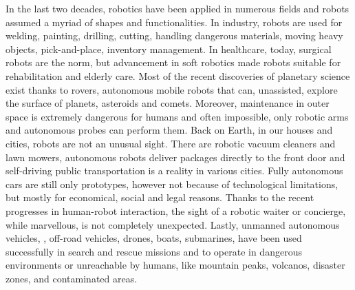 In the last two decades, robotics have been applied in numerous fields and robots assumed a myriad of shapes and functionalities. In industry, robots are used for welding, painting, drilling, cutting, handling dangerous materials, moving heavy objects, pick-and-place, inventory management. In healthcare, today, surgical robots are the norm, but advancement in soft robotics made robots suitable for rehabilitation and elderly care. Most of the recent discoveries of planetary science exist thanks to rovers, autonomous mobile robots that can, unassisted, explore the surface of planets, asteroids and comets. Moreover, maintenance in outer space is extremely dangerous for humans and often impossible, only robotic arms and autonomous probes can perform them. Back on Earth, in our houses and cities, robots are not an unusual sight. There are robotic vacuum cleaners and lawn mowers,  autonomous robots deliver packages directly to the front door and self-driving public transportation is a reality in various cities. Fully autonomous cars are still only prototypes, however not because of technological limitations, but mostly for economical, social and legal reasons. Thanks to the recent progresses in human-robot interaction, the sight of a robotic waiter or concierge, while marvellous, is not completely unexpected. Lastly, unmanned autonomous vehicles, \eg, off-road vehicles, drones, boats, submarines,  have been used successfully in search and rescue missions and to operate in dangerous environments or unreachable by humans, like mountain peaks, volcanos, disaster zones, and contaminated areas.

